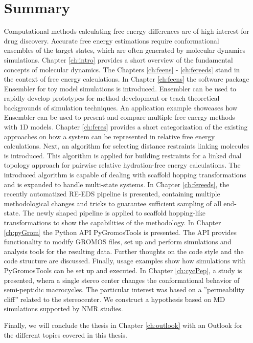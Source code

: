 \chapter{Summary}
Computational methods calculating free energy differences are of high interest for drug discovery. Accurate free energy estimations require conformational ensembles of the target states, which are often generated by molecular dynamics simulations. Chapter \ref{ch:intro} provides a short overview of the fundamental concepts of molecular dynamics.   
The Chapters \ref{ch:feens} - \ref{ch:fereeds} stand in the context of free energy calculations. 
In Chapter \ref{ch:feens} the software package Ensembler for toy model simulations is introduced. Ensembler can be used to rapidly develop prototypes for method development or teach theoretical backgrounds of simulation techniques.  An application example showcases how Ensembler can be used to present and compare multiple free energy methods with 1D models. 
Chapter \ref{ch:feres} provides a short categorization of the existing approaches on how a system can be represented in relative free energy calculations. Next, an algorithm for selecting distance restraints linking molecules is introduced. This algorithm is applied for building restraints for a linked dual topology approach for pairwise relative hydration-free energy calculations. The introduced algorithm is capable of dealing with scaffold hopping transformations and is expanded to handle multi-state systems.
In Chapter \ref{ch:fereeds}, the recently automatized RE-EDS pipeline is presented, containing multiple methodological changes and tricks to guarantee sufficient sampling of all end-state. The newly shaped pipeline is applied to scaffold hopping-like transformations to show the capabilities of the methodology.
In Chapter \ref{ch:pyGrom} the Python API PyGromosTools is presented. The API provides functionality to modify GROMOS files, set up and perform simulations and analysis tools for the resulting data. Further thoughts on the code style and the code structure are discussed. Finally, usage examples show how simulations with PyGromosTools can be set up and executed. 
In Chapter \ref{ch:cycPep}, a study is presented, whera a single stereo center changes  the conformational behavior of semi-peptidic macrocycles. The particular interest was based on a ''permeability cliff'' related to the stereocenter. We construct a hypothesis based on MD simulations supported by NMR studies.

Finally, we will conclude the thesis in Chapter \ref{ch:outlook} with an Outlook for the different topics covered in this thesis.